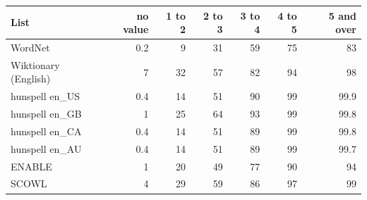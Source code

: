 \begin{tabular}{lrrrrrr}
\toprule
List & no value & 1 to 2 & 2 to 3 & 3 to 4 & 4 to 5 & 5 and over \\
\midrule
WordNet & 0.2 & 9 & 31 & 59 & 75 & 83 \\
Wiktionary (English) & 7 & 32 & 57 & 82 & 94 & 98 \\
hunspell en\_US & 0.4 & 14 & 51 & 90 & 99 & 99.9 \\
hunspell en\_GB & 1 & 25 & 64 & 93 & 99 & 99.8 \\
hunspell en\_CA & 0.4 & 14 & 51 & 89 & 99 & 99.8 \\
hunspell en\_AU & 0.4 & 14 & 51 & 89 & 99 & 99.7 \\
ENABLE & 1 & 20 & 49 & 77 & 90 & 94 \\
SCOWL & 4 & 29 & 59 & 86 & 97 & 99 \\
\bottomrule
\end{tabular}
